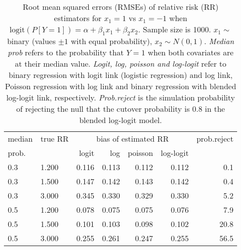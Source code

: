 \documentclass[12pt,a4paper]{article}
\begin{document}
\begin{table}[H] 
\small\sf\centering 
\caption{Root mean squared errors (RMSEs) of relative risk (RR) estimators for $x_1=1$ vs $x_1=-1$ when $\mbox{logit}(P[Y=1])=\alpha+\beta_1 x_1 + \beta_2 x_2$. Sample size is 1000. $x_1 \sim $binary (values $\pm 1$ with equal probability), $x_2 \sim N(0,1)$. {\it Median prob} refers to the probability that $Y=1$ when both covariates are at their median value. {\it Logit, log, poisson and log-logit} refer to binary regression with logit link (logistic regression) and log link, Poisson regression with log link and binary regression with blended log-logit link, respectively. {\it Prob.reject} is the simulation probability of rejecting the null that the cutover probability is $0.8$ in the blended log-logit model.} 
\begin{tabular}{llrrrrr} 
\toprule 
median & true RR & \multicolumn{4}{c}{bias of estimated RR} & prob.reject \\ 
prob. & & logit & log & poisson & log-logit  & \\ \midrule 
0.3 & 1.200 & 0.116 & 0.113 & 0.112 & 0.112 &  0.1 \\  
0.3 & 1.500 & 0.147 & 0.142 & 0.143 & 0.142 &  0.4 \\  
0.3 & 3.000 & 0.345 & 0.330 & 0.329 & 0.330 &  5.2 \\  
0.5 & 1.200 & 0.078 & 0.075 & 0.075 & 0.076 &  7.9 \\  
0.5 & 1.500 & 0.101 & 0.103 & 0.098 & 0.102 & 20.8 \\  
0.5 & 3.000 & 0.255 & 0.261 & 0.247 & 0.255 & 56.5 \\  
\bottomrule 
\end{tabular} 
\end{table} 
\end{document}
